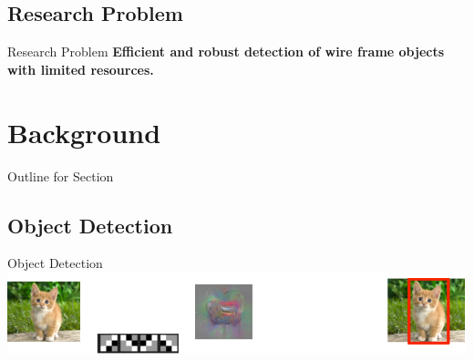 \documentclass{beamer}
\begin{document}
\begin{darkframes}
	\subsection{Research Problem}    
	\begin{frame}{Research Problem}
	\textbf{Efficient and robust detection of wire frame objects with limited resources.}
	\end{frame}
    
    \section{Background}
    \begin{frame}{Outline for Section \thesection}
    \tableofcontents[currentsection]
	\end{frame}
\subsection{Object Detection}
	\begin{frame}{Object Detection}
	\includegraphics[width=\textwidth]{fig/ObjectDetection}
	\end{frame}

\end{darkframes}
\end{document}
